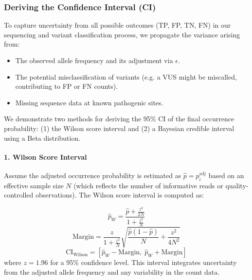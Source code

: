 
\subsubsection{Deriving the Confidence Interval (CI)}

To capture uncertainty from all possible outcomes (TP, FP, TN, FN) in our sequencing and variant classification process, we propagate the variance arising from:

\begin{itemize}
    \item The observed allele frequency and its adjustment via \(\epsilon\).
    \item The potential misclassification of variants (e.g. a VUS might be miscalled, contributing to FP or FN counts).
    \item Missing sequence data at known pathogenic sites.
\end{itemize}

We demonstrate two methods for deriving the 95\% CI of the final occurrence probability: (1) the Wilson score interval and (2) a Bayesian credible interval using a Beta distribution.

\paragraph{1. Wilson Score Interval}

Assume the adjusted occurrence probability is estimated as \(\hat{p} = p_i^{\text{adj}}\) based on an effective sample size \(N\) (which reflects the number of informative reads or quality‐controlled observations). The Wilson score interval is computed as:

\[
\hat{p}_W = \frac{\hat{p} + \frac{z^2}{2N}}{1 + \frac{z^2}{N}}
\]
\[
\text{Margin} = \frac{z}{1 + \frac{z^2}{N}} \sqrt{ \frac{\hat{p}(1-\hat{p})}{N} + \frac{z^2}{4N^2} }
\]
\[
\text{CI}_{\text{Wilson}} = \left[ \hat{p}_W - \text{Margin}, \; \hat{p}_W + \text{Margin} \right]
\]
where \(z = 1.96\) for a 95\% confidence level. This interval integrates uncertainty from the adjusted allele frequency and any variability in the count data.

